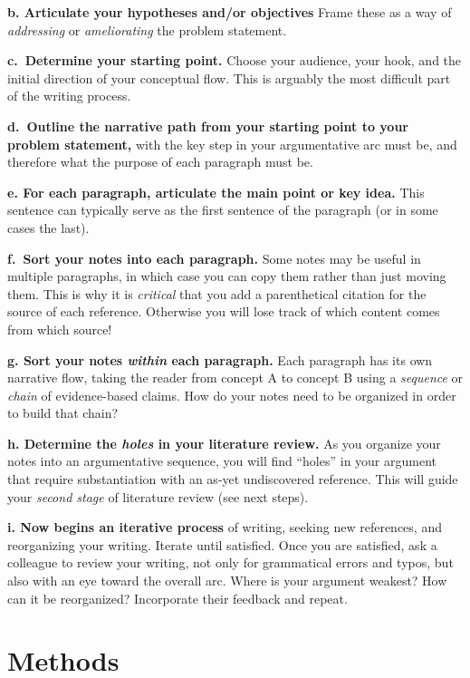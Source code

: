 \documentclass[
]{book}
\begin{document}
\textbf{b. Articulate your hypotheses and/or objectives} Frame these as a way of \emph{addressing} or \emph{ameliorating} the problem statement.

\textbf{c.~Determine your starting point.} Choose your audience, your hook, and the initial direction of your conceptual flow. This is arguably the most difficult part of the writing process.

\textbf{d.~Outline the narrative path from your starting point to your problem statement,} with the key step in your argumentative arc must be, and therefore what the purpose of each paragraph must be.

\textbf{e. For each paragraph, articulate the main point or key idea.} This sentence can typically serve as the first sentence of the paragraph (or in some cases the last).

\textbf{f.~Sort your notes into each paragraph.} Some notes may be useful in multiple paragraphs, in which case you can copy them rather than just moving them. This is why it is \emph{critical} that you add a parenthetical citation for the source of each reference. Otherwise you will lose track of which content comes from which source!

\textbf{g. Sort your notes \emph{within} each paragraph.} Each paragraph has its own narrative flow, taking the reader from concept A to concept B using a \emph{sequence} or \emph{chain} of evidence-based claims. How do your notes need to be organized in order to build that chain?

\textbf{h. Determine the \emph{holes} in your literature review.} As you organize your notes into an argumentative sequence, you will find ``holes'' in your argument that require substantiation with an as-yet undiscovered reference. This will guide your \emph{second stage} of literature review (see next steps).

\textbf{i. Now begins an iterative process} of writing, seeking new references, and reorganizing your writing. Iterate until satisfied. Once you are satisfied, ask a colleague to review your writing, not only for grammatical errors and typos, but also with an eye toward the overall arc. Where is your argument weakest? How can it be reorganized? Incorporate their feedback and repeat.

\hypertarget{methods}{%
\section*{Methods}\label{methods}}
\end{document}
